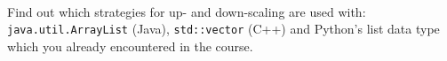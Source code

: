  \\
Find out which strategies for up- and down-scaling are used with:
\texttt{java.util.ArrayList} (Java), \texttt{std::vector} (C++) and Python's 
list data type which you already encountered in the course.

